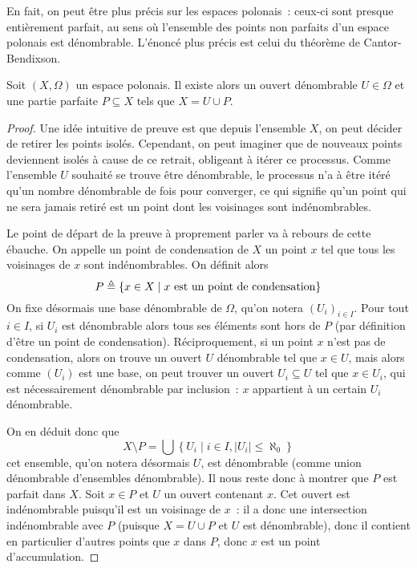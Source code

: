En fait, on peut être plus précis sur les espaces polonais~: ceux-ci sont
presque entièrement parfait, au sens où l'ensemble des points non parfaits d'un
espace polonais est dénombrable. L'énoncé plus précis est celui du théorème de
Cantor-Bendixson.

\begin{theorem}
  Soit $(X,\Omega)$ un espace polonais. Il existe alors un ouvert dénombrable
  $U\in \Omega$ et une partie parfaite $P\subseteq X$ tels que
  $X = U \cup P$.
\end{theorem}

\begin{proof}
  Une idée intuitive de preuve est que depuis l'ensemble $X$, on peut décider
  de retirer les points isolés. Cependant, on peut imaginer que de nouveaux
  points deviennent isolés à cause de ce retrait, obligeant à itérer ce
  processus. Comme l'ensemble $U$ souhaité se trouve être dénombrable, le
  processus n'a à être itéré qu'un nombre dénombrable de fois pour converger,
  ce qui signifie qu'un point qui ne sera jamais retiré est un point dont les
  voisinages sont indénombrables.

  Le point de départ de la preuve à proprement parler va à rebours de cette
  ébauche. On appelle un point de condensation de $X$ un point $x$ tel que
  tous les voisinages de $x$ sont indénombrables. On définit alors
  \[P \triangleq \{x \in X \mid x\text{ est un point de condensation}\}\]
  On fixe désormais une base dénombrable de $\Omega$, qu'on notera
  $(U_i)_{i\in I}$. Pour tout $i\in I$, si $U_i$ est dénombrable alors tous ses
  éléments sont hors de $P$ (par définition d'être un point de condensation).
  Réciproquement, si un point $x$ n'est pas de condensation, alors on trouve un
  ouvert $U$ dénombrable tel que $x\in U$, mais alors comme $(U_i)$ est une
  base, on peut trouver un ouvert $U_i\subseteq U$ tel que $x\in U_i$, qui est
  nécessairement dénombrable par inclusion~: $x$ appartient à un certain $U_i$
  dénombrable.

  On en déduit donc que
  \[X\setminus P = \bigcup\left\{U_i\mid i \in I, |U_i| \leq \aleph_0\right\}\]
  cet ensemble, qu'on notera désormais $U$, est dénombrable (comme union
  dénombrable d'ensembles dénombrable). Il nous reste donc à montrer que $P$ est
  parfait dans $X$. Soit $x\in P$ et $U$ un ouvert contenant $x$. Cet ouvert
  est indénombrable puisqu'il est un voisinage de $x$~: il a donc une
  intersection indénombrable avec $P$ (puisque $X = U \cup P$ et $U$ est
  dénombrable), donc il contient en particulier d'autres points que $x$ dans
  $P$, donc $x$ est un point d'accumulation.
\end{proof}

